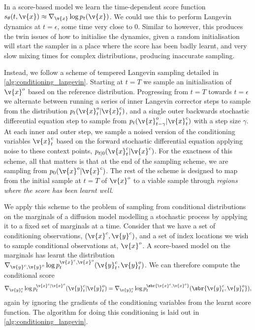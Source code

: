 In a score-based model we learn the time-dependent score function \(s_\theta(t, \v{x}) \approx \nabla_{\v{x}}\log p_t(\v{x})\).
We could use this to perform Langevin dynamics at \(t=\epsilon\), some time very close to \(0\).
Similar to \textcite{song2019generative} however, this produces the twin issues of how to initialise the dynamics, given a random initialisation will start the sampler in a place where the score has been badly learnt, and very slow mixing times for complex distributions, producing inaccurate sampling.

Instead, we follow a scheme of tempered Langevin sampling detailed in \cref{alg:conditioning_langevin}.
Starting at \(t=T\) we sample an initialisation of \(\v{x}^o\) based on the reference distribution.
Progressing from \(t=T\) towards \(t=\epsilon\) we alternate between running a series of inner Langevin corrector steps to sample from the distribution \(p_{t}(\v{x}^o_t | \v{x}^c_t)\), and a single outer backwards stochastic differential equation step to sample from \(p_{t}(\v{x}^o_{t-\gamma} | \v{x}^c_t)\) with a step size \(\gamma\).
At each inner and outer step, we sample a noised version of the conditioning variables \(\v{x}^c_t\) based on the forward stochastic differential equation applying noise to these context points, \(p_{t|0}(\v{x}_t^c | \v{x}^c)\).
For the exactness of this scheme, all that matters is that at the end of the sampling scheme, we are sampling from \(p_{0}(\v{x}^o | \v{x}^c)\).
The rest of the scheme is designed to map from the initial sample at \(t=T\) of \(\v{x}^o\) to a viable sample through \textit{regions where the score has been learnt well}.

We apply this scheme to the problem of sampling from conditional distributions on the marginals of a diffusion model modelling a stochastic process by applying it to a fixed set of marginals at a time.
Consider that we have a set of conditioning observations, \((\v{x}^c, \v{y}^c)\), and a set of index locations we wish to sample conditional observations at, \(\v{x}^o\).
A score-based model on the marginals has learnt the distribution \(\nabla_{\v{y}^c, \v{y}^o}\log p_t^{\v{x}^c, \v{x}^o}(\v{y}^c_t, \v{y}^o_t)\).
We can therefore compute the conditional score
\[
	\nabla_{\v{y}^o_t} \log p_t^{\v{x}^c | \v{x}^o}(\v{y}^c_t| \v{y}^o_t) = \nabla_{\v{y}^o_t} \log p_t^{\sbr{\v{x}^c, \v{x}^o}}(\sbr{\v{y}^c_t, \v{y}^o_t}),
\] again by ignoring the gradients of the conditioning variables from the learnt score function.
The algorithm for doing this conditioning is laid out in \cref{alg:conditioning_langevin}.

